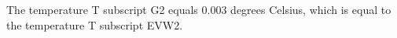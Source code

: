 The temperature T subscript G2 equals 0.003 degrees Celsius, which is equal to the temperature T subscript EVW2.